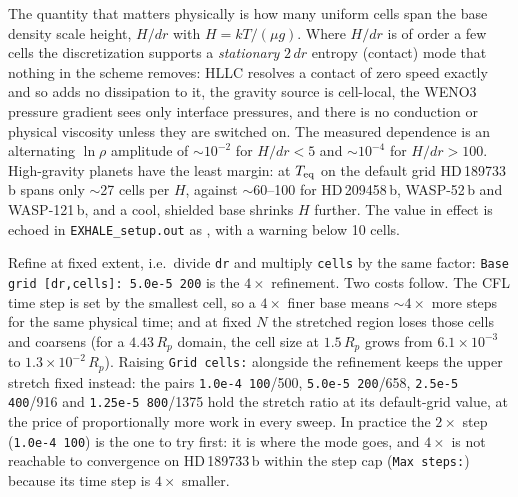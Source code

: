\documentclass[english,a4paper]{my_memo}
\begin{document}
The quantity that matters physically is how many uniform cells span the base
density scale height, $H/dr$ with $H=kT/(\mu g)$. Where $H/dr$ is of order a few
cells the discretization supports a \emph{stationary} $2\,dr$ entropy (contact)
mode that nothing in the scheme removes: HLLC resolves a contact of zero speed
exactly and so adds no dissipation to it, the gravity source is cell-local, the
WENO3 pressure gradient sees only interface pressures, and there is no
conduction or physical viscosity unless they are switched on. The measured
dependence is an alternating $\ln\rho$ amplitude of $\sim$$10^{-2}$ for
$H/dr<5$ and $\sim$$10^{-4}$ for $H/dr>100$. High-gravity planets have the
least margin: at $T_{\rm eq}$ on the default grid HD\,189733\,b spans only
$\sim$27 cells per $H$, against $\sim$60--100 for HD\,209458\,b, WASP-52\,b and
WASP-121\,b, and a cool, shielded base shrinks $H$ further. The value in
effect is echoed in \texttt{EXHALE\_setup.out} as , with a warning below 10 cells.

Refine at fixed extent, i.e.\ divide \texttt{dr} and multiply \texttt{cells} by
the same factor: \texttt{Base grid [dr,cells]: 5.0e-5 200} is the $4\times$
refinement. Two costs follow. The CFL time step is set by the smallest cell, so
a $4\times$ finer base means $\sim$$4\times$ more steps for the same physical
time; and at fixed $N$ the stretched region loses those cells and coarsens
(for a $4.43\,R_p$ domain, the cell size at $1.5\,R_p$ grows from
$6.1\times10^{-3}$ to $1.3\times10^{-2}\,R_p$). Raising \texttt{Grid cells:}
alongside the refinement keeps the upper stretch fixed instead: the pairs
\texttt{1.0e-4 100}/500, \texttt{5.0e-5 200}/658, \texttt{2.5e-5 400}/916 and
\texttt{1.25e-5 800}/1375 hold the stretch ratio at its default-grid value,
at the price of proportionally more work in every sweep. In practice the
$2\times$ step
(\texttt{1.0e-4 100}) is the one to try first: it is where the mode goes, and
$4\times$ is not reachable to convergence on HD\,189733\,b within the
step cap (\texttt{Max steps:}) because its time step is $4\times$ smaller.
\end{document}
